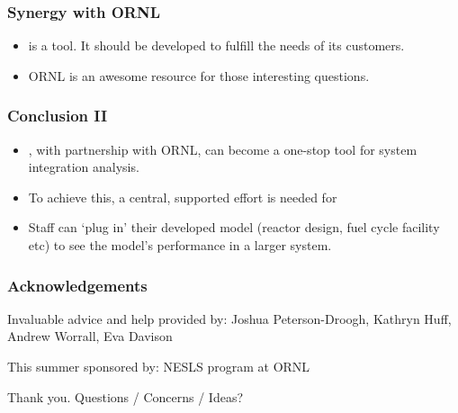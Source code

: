\begin{frame}
	\frametitle{Synergy with ORNL}
	\begin{itemize}
		\item \Cyclus is a tool. It should be developed to fulfill the needs of its customers.
		\item ORNL is an awesome resource for those interesting questions.
	\end{itemize}
\end{frame}


\begin{frame}
	\frametitle{Conclusion II}
	\begin{itemize}
		\item \Cyclus, with partnership with ORNL, can become a one-stop tool for system integration analysis.
		\item To achieve this, a central, supported effort is needed for \Cyclus
		\item Staff can `plug in' their developed model (reactor design, fuel cycle facility etc) to see the model's performance in a larger system.
	\end{itemize}
\end{frame}




\begin{frame}
    \frametitle{Acknowledgements}
    Invaluable advice and help provided by:
    Joshua Peterson-Droogh, Kathryn Huff, Andrew Worrall, Eva Davison

    This summer sponsored by:
    NESLS program at ORNL
\end{frame}

\begin{frame}
    Thank you. Questions / Concerns / Ideas?
\end{frame}